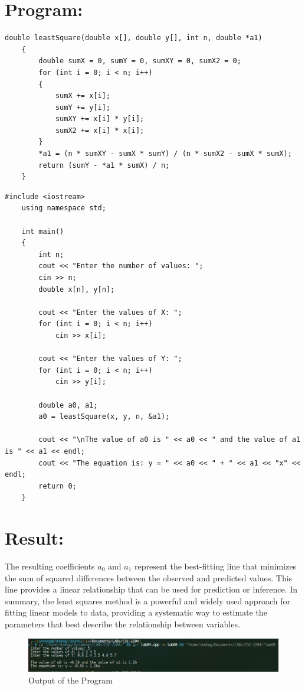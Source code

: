 \documentclass[a4paper,12pt]{report}
\begin{document}
\newpage
\section*{Program:}
\begin{lstlisting}[style=cppstyle, caption={Least Square Method Model}, label={lst:cppcode}, basicstyle=\fontsize{10}{10}\selectfont\ttfamily]
    double leastSquare(double x[], double y[], int n, double *a1)
    {
        double sumX = 0, sumY = 0, sumXY = 0, sumX2 = 0;
        for (int i = 0; i < n; i++)
        {
            sumX += x[i];
            sumY += y[i];
            sumXY += x[i] * y[i];
            sumX2 += x[i] * x[i];
        }
        *a1 = (n * sumXY - sumX * sumY) / (n * sumX2 - sumX * sumX);
        return (sumY - *a1 * sumX) / n;
    }
\end{lstlisting}

\begin{lstlisting}[style=cppstyle, caption={Main Program}, label={lst:cppcode}, basicstyle=\fontsize{10}{10}\selectfont\ttfamily]
    #include <iostream>
    using namespace std;
    
    int main()
    {
        int n;
        cout << "Enter the number of values: ";
        cin >> n;
        double x[n], y[n];
    
        cout << "Enter the values of X: ";
        for (int i = 0; i < n; i++)
            cin >> x[i];
    
        cout << "Enter the values of Y: ";
        for (int i = 0; i < n; i++)
            cin >> y[i];
    
        double a0, a1;
        a0 = leastSquare(x, y, n, &a1);
    
        cout << "\nThe value of a0 is " << a0 << " and the value of a1 is " << a1 << endl;
        cout << "The equation is: y = " << a0 << " + " << a1 << "x" << endl;
        return 0;
    }
\end{lstlisting}

\section*{Result:}
\qquad The resulting coefficients $a_0$ and $a_1$ represent the best-fitting line that minimizes the sum of squared differences between the observed and predicted values. This line provides a linear relationship that can be used for prediction or inference. In summary, the least squares method is a powerful and widely used approach for fitting linear models to data, providing a systematic way to estimate the parameters that best describe the relationship between variables.
\begin{figure}[H]
    \centering
    \includegraphics[width=\textwidth]{result.png}
    \caption{Output of the Program}
    \label{fig:result}
\end{figure}
\end{document}
